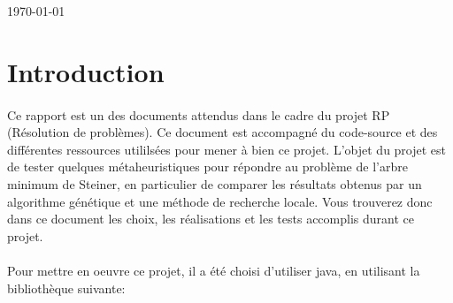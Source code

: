 \begin{titlepage}


\vfill %
{\small \today}\\[2cm] %

\end{titlepage}

\newpage
\tableofcontents

\newpage
\section*{Introduction}
	\paragraph{}Ce rapport est un des documents attendus dans le cadre du projet RP (Résolution de problèmes). Ce document est accompagné du code-source et des différentes ressources utililsées pour mener à bien ce projet.
     L’objet du projet est de tester quelques métaheuristiques pour répondre au problème de l'arbre minimum de Steiner, en particulier de comparer les résultats obtenus par un algorithme génétique et une méthode de recherche locale.
     Vous trouverez donc dans ce document les choix, les réalisations et les tests accomplis durant ce projet.

	\paragraph{} Pour mettre en oeuvre ce projet, il a été choisi d'utiliser java, en utilisant la bibliothèque suivante: 
	
